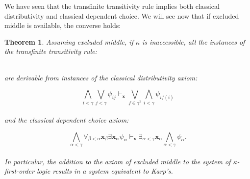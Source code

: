 \documentclass[a4paper,11pt]{article}
\theoremstyle{plain}
\newtheorem{thm}{Theorem}[subsection]
\theoremstyle{plain}
\theoremstyle{remark}
\begin{document}
We have seen that the transfinite transitivity rule implies both classical distributivity and classical dependent choice. We will see now that if excluded middle is available, the converse holds:

\begin{thm}\label{equiv}
Assuming excluded middle, if $\kappa$ is inaccessible, all the instances of the transfinite transitivity rule:

\begin{mathpar}
\end{mathpar}
\\ 
are derivable from instances of the classical distributivity axiom:

$$\bigwedge_{i<\gamma}\bigvee_{j<\gamma} \psi_{ij} \vdash_{\mathbf{x}} \bigvee_{f \in \gamma^{\gamma}}\bigwedge_{i<\gamma} \psi_{if(i)}$$
\\and the classical dependent choice axiom:

$$\bigwedge_{\alpha < \gamma} \forall_{\beta < \alpha}\mathbf{x}_{\beta} \exists \mathbf{x}_{\alpha} \psi_{\alpha} \vdash_{\mathbf{x}} \exists_{\alpha < \gamma} \mathbf{x}_{\alpha} \bigwedge_{\alpha < \gamma} \psi_{\alpha}.$$
\\
In particular, the addition to the axiom of excluded middle to the system of $\kappa$-first-order logic results in a system equivalent to Karp's.
\end{thm}
\end{document}

